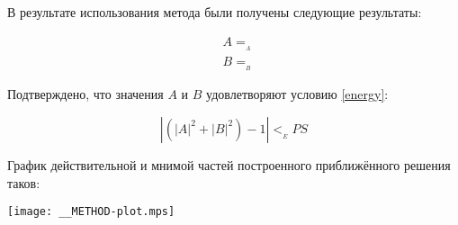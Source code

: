 В результате использования метода были получены следующие результаты:

\begin{equation}\label{__METHOD-results}
  \begin{aligned}
    &A=__A \\
    &B=__B
  \end{aligned}
\end{equation}

Подтверждено, что значения $A$ и $B$ удовлетворяют условию \ref{energy}:

\begin{displaymath}
  \left | \left( |A|^2 + |B|^2 \right) - 1 \right | < __EPS
\end{displaymath}

График действительной и мнимой частей построенного приближённого
решения таков:

\texttt{[image: \_\_METHOD-plot.mps]}
